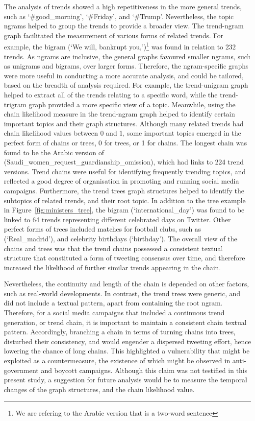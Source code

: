 \documentclass{comjnl}
\begin{document}
{The analysis of trends showed a high repetitiveness in the more general trends, such as ‘\#good\_morning’, ‘\#Friday’, and ‘\#Trump’. Nevertheless, the topic ngrams helped to group the trends to provide a broader view. The trend-ngram graph facilitated the measurement of various forms of related trends.  For example, the bigram (‘We will, bankrupt you,’)\footnote{We are refering to the Arabic version that is a two-word sentence} was found in relation to 232 trends. As ngrams are inclusive, the general graphs favoured smaller ngrams, such as unigrams and bigrams, over larger forms. Therefore, the ngram-specific graphs were more useful in conducting a more accurate analysis, and could be tailored, based on the breadth of analysis required.  For example, the trend-unigram graph helped to extract all of the trends relating to a specific word, while the trend-trigram graph provided a more specific view of a topic.  Meanwhile, using the chain likelihood measure in the trend-ngram graph helped to identify certain important topics and their graph structures. Although many related trends had chain likelihood values between 0 and 1, some important topics emerged in the perfect form of chains or trees, 0 for trees, or 1 for chains.  The longest chain was found to be the Arabic version of (Saudi\_women\_request\_guardianship\_omission), which had links to 224 trend versions. Trend chains were useful for identifying frequently trending topics, and reflected a good degree of organisation in promoting and running social media campaigns. Furthermore, the trend trees graph structures helped to identify the subtopics of related trends, and their root topic. In addition to the tree example in Figure~\ref{fig:ministers_tree}, the bigram (‘international\_day’) was found to be linked to 64 trends representing different celebrated days on Twitter. Other perfect forms of trees included matches for football clubs, such as (‘Real\_madrid’), and celebrity birthdays (‘birthday’).  The overall view of the chains and trees was that the trend chains possessed a consistent textual structure that constituted a form of tweeting consensus over time, and therefore increased the likelihood of further similar trends appearing in the chain. 


Nevertheless, the continuity and length of the chain is depended on other factors, such as real-world developments. In contrast, the trend trees were generic, and did not include a textual pattern, apart from containing the root ngram.  Therefore, for a social media campaigns that included a continuous trend generation, or trend chain, it is important to maintain a consistent chain textual pattern. Accordingly, branching a chain in terms of turning chains into trees, disturbed their consistency, and would engender a dispersed tweeting effort, hence lowering the chance of long chains.  This highlighted a vulnerability that might be exploited as a countermeasure, the existence of which might be observed in anti-government and boycott campaigns. Although this claim was not testified in this present study, a suggestion for future analysis would be to measure the temporal changes of the graph structures, and the chain likelihood value.  


}
\end{document}
